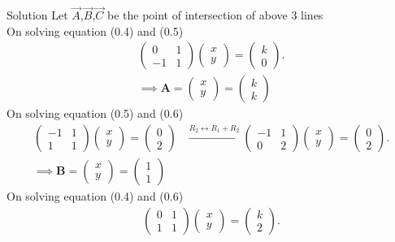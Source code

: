 \documentclass{beamer}
\numberwithin{equation}{section}
\theoremstyle{remark}
\newcommand{\myvec}[1]{\ensuremath{\begin{pmatrix}#1\end{pmatrix}}}
\let\vec\mathbf
\begin{document}
    \begin{frame}{Solution}
Let $\Vec{A}$,$\Vec{B}$,$\Vec{C}$ be the point of intersection of above 3 lines\\
On solving equation (0.4) and (0.5)
\begin{align}
    \begin{pmatrix}
        0 & 1\\
        -1 & 1
    \end{pmatrix} \myvec{x\\y}=\myvec{k\\0}.\\
    \implies \vec{A}=\myvec{x\\y}=\myvec{k\\k}
\end{align}
On solving equation (0.5) and (0.6)
\begin{align}
    \begin{pmatrix}
        -1 & 1\\
        1 & 1
    \end{pmatrix} \myvec{x\\y}=\myvec{0\\2} &\xrightarrow{R_2 \leftrightarrow R_1+R_2} \begin{pmatrix}
        -1 & 1\\
        0 & 2
    \end{pmatrix} \myvec{x\\y}=\myvec{0\\2}.\\
 \implies \vec{B}=\myvec{x\\y}=\myvec{1\\1}
\end{align}
On solving equation (0.4) and (0.6)
\begin{align}
    \begin{pmatrix}
        0 & 1\\
        1 & 1
    \end{pmatrix} \myvec{x\\y}=\myvec{k\\2}.
    \end{align}
    \end{frame}
\end{document}
